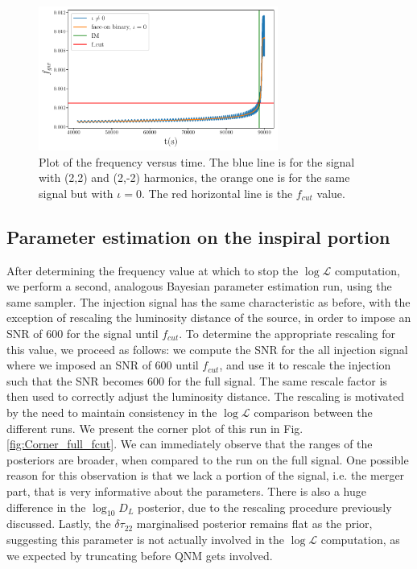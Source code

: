 \begin{figure}[h!]
    \centering
    \includegraphics[width=0.7\textwidth]{Images/Frequency_cut.pdf}
    \caption{Plot of the frequency versus time. The blue line is for the signal with (2,2) and (2,-2) harmonics, the orange one is for the same signal but with $ \iota = 0$. The red horizontal line is the $f_{cut}$ value. }
    \label{fig:Frequency_cut}
\end{figure}



\subsection{Parameter estimation on the inspiral portion}

After determining the frequency value at which to stop the $\log \mathcal{L}$ computation, we perform a second, analogous Bayesian parameter estimation run, using the same sampler. The injection signal has the same characteristic as before, with the exception of rescaling the luminosity distance of the source, in order to impose an SNR of 600 for the signal until $f_{cut}$. To determine the appropriate rescaling for this value, we proceed as follows: we compute the SNR for the all injection signal where we imposed an SNR of 600 until $f_{cut}$, and use it to rescale the injection such that the SNR becomes 600 for the full signal. The same rescale factor is then used to correctly adjust the luminosity distance.
The rescaling is motivated by the need to maintain consistency in the $\log \mathcal{L}$ comparison between the different runs. We present the corner plot of this run in Fig. \ref{fig:Corner_full_fcut}. We can immediately observe that the ranges of the posteriors are broader, when compared to the run on the full signal. One possible reason for this observation is that we lack a portion of the signal, i.e. the merger part, that is very informative about the parameters. There is also a huge difference in the $\log_{10} D_L$ posterior, due to the rescaling procedure previously discussed. Lastly, the $\delta \tau_{22}$ marginalised posterior remains flat as the prior, suggesting this parameter is not actually involved in the $\log \mathcal{L}$ computation, as we expected by truncating before QNM gets involved. 



